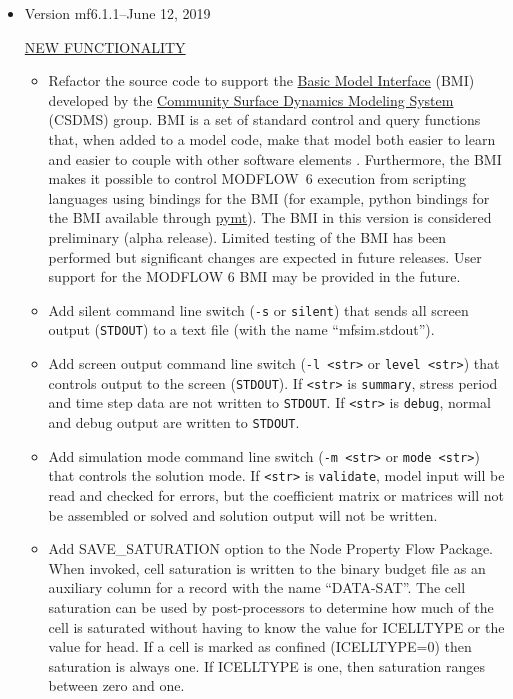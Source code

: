 \documentclass[11pt,twoside,twocolumn]{usgsreport}
\begin{document}
\begin{itemize}
	\item Version mf6.1.1--June 12, 2019

	\underline{NEW FUNCTIONALITY}
	\begin{itemize}
		\item Refactor the source code to support the \href{https://csdms.colorado.edu/wiki/BMI_Description}{Basic Model Interface} (BMI) developed by the \href{https://csdms.colorado.edu/wiki/Main_Page}{Community Surface Dynamics Modeling System} (CSDMS) group. BMI is a set of standard control and query functions that, when added to a model code, make that model both easier to learn and easier to couple with other software elements \citep{PECKHAM20133}. Furthermore, the BMI makes it possible to control MODFLOW~6 execution from scripting languages using bindings for the BMI (for example, python bindings for the BMI available through \href{https://csdms.colorado.edu/wiki/PyMT}{pymt}). The BMI in this version is considered preliminary (alpha release). Limited testing of the BMI has been performed but significant changes are expected in future releases.  User support for the MODFLOW 6 BMI may be provided in the future.
		\item Add silent command line switch (\texttt{-s} or \texttt{\doubledash silent}) that sends all screen output (\texttt{STDOUT}) to a text file (with the name ``mfsim.stdout'').
		\item Add screen output command line switch (\texttt{-l <str>} or \texttt{\doubledash level <str>}) that controls output to the screen (\texttt{STDOUT}). If \texttt{<str>}  is \texttt{summary}, stress period and time step data are not written to \texttt{STDOUT}. If \texttt{<str>} is \texttt{debug}, normal and debug output are written to \texttt{STDOUT}. 
		\item Add simulation mode command line switch (\texttt{-m <str>} or \texttt{\doubledash mode <str>}) that controls the solution mode. If \texttt{<str>}  is \texttt{validate}, model input will be read and checked for errors, but the coefficient matrix or matrices will not be assembled or solved and solution output will not be written.
		\item Add SAVE\_SATURATION option to the Node Property Flow Package.  When invoked, cell saturation is written to the binary budget file as an auxiliary column for a record with the name ``DATA-SAT''.  The cell saturation can be used by post-processors to determine how much of the cell is saturated without having to know the value for ICELLTYPE or the value for head. If a cell is marked as confined (ICELLTYPE=0) then saturation is always one. If ICELLTYPE is one, then saturation ranges between zero and one.

\end{itemize}
\end{itemize}
\end{document}
